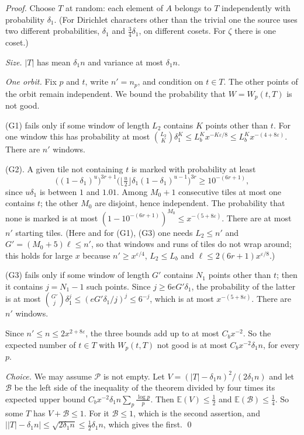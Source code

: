 \documentclass[11pt,letterpaper]{article}
\begin{document}
\emph{Proof.} Choose $T$ at random: each element of $A$ belongs to $T$ independently with probability
$\delta_1$. (For Dirichlet characters other than the trivial one the source uses two different
probabilities, $\delta_1$ and $\frac34\delta_1$, on different cosets. For $\zeta$ there is one coset.)

\emph{Size.} $|T|$ has mean $\delta_1n$ and variance at most $\delta_1n$.

\emph{One orbit.} Fix $p$ and $t$, write $n'=n_p$, and condition on $t\in T$. The other points of the orbit
remain independent. We bound the probability that $W=W_p(t,T)$ is not good.

(G1) fails only if some window of length $L_2$ contains $K$ points other than $t$. For one window this has
probability at most $\binom{L_2}K\delta_1^K\le L_b^Kx^{-K\varepsilon/8}\le L_b^Kx^{-(4+8\varepsilon)}$. There
are $n'$ windows.

(G2). A given tile not containing $t$ is marked with probability at least
\begin{equation}\label{D:143}
 \big((1-\delta_1)^u\big)^{3r+1}\Big(\big\lfloor\tfrac u2\big\rfloor\delta_1(1-\delta_1)^{u-1}\Big)^{3r}\ge10^{-(6r+1)},
\end{equation}
since $u\delta_1$ is between $1$ and $1.01$. Among $M_0+1$ consecutive tiles at most one contains $t$;
the other $M_0$ are disjoint, hence independent. The probability that none is marked is at most
$(1-10^{-(6r+1)})^{M_0}\le x^{-(5+8\varepsilon)}$. There are at most $n'$ starting tiles. (Here and for (G1), (G3)
one needs $L_2\le n'$ and $G'=(M_0+5)\ell\le n'$, so that windows and runs of tiles do not wrap around; this holds for large $x$ because
$n'\ge x^{\varepsilon/4}$, $L_2\le L_b$ and $\ell\le2(6r+1)x^{\varepsilon/8}$.)

(G3) fails only if some window of length $G'$ contains $N_1$ points other than $t$; then it contains
$j=N_1-1$ such points. Since
$j\ge6eG'\delta_1$, the probability of the latter is at most $\binom{G'}{j}\delta_1^j\le(eG'\delta_1/j)^j\le6^{-j}$, which is at
most $x^{-(5+8\varepsilon)}$. There are $n'$ windows.

Since $n'\le n\le2x^{2+8\varepsilon}$, the three bounds add up to at most $C_bx^{-2}$. So the expected number
of $t\in T$ with $W_p(t,T)$ not good is at most $C_bx^{-2}\delta_1n$, for every $p$.

\emph{Choice.} We may assume $\mathcal P$ is not empty. Let $V=(|T|-\delta_1n)^2/(2\delta_1n)$ and let $\mathcal B$ be the left side of the inequality
of the theorem divided by four times its expected upper bound $C_bx^{-2}\delta_1n\sum_p\frac{\log p}p$. Then
$\mathbb E(V)\le\frac12$ and $\mathbb E(\mathcal B)\le\frac14$. So some $T$ has $V+\mathcal B\le1$. For it
$\mathcal B\le1$, which is the second assertion, and $\big||T|-\delta_1n\big|\le\sqrt{2\delta_1n}\le\frac12\delta_1n$,
which gives the first. \qed
\end{document}
